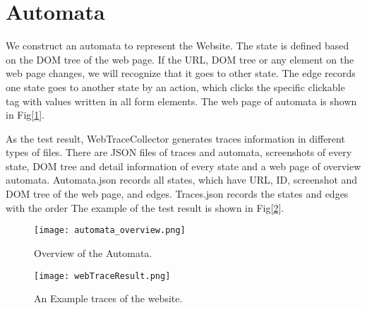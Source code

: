 
\clearpage

\section{Automata}

We construct an automata to represent the Website.
The state is defined based on the DOM tree of the web page.
If the URL, DOM tree or any element on the web page changes, we will recognize that it goes to other state.
The edge records one state goes to another state by an action,
which clicks the specific clickable tag with values written in all form elements.
The web page of automata is shown in Fig[\ref{AutomataOverview}].

As the test result, WebTraceCollector generates traces information in different types of files. 
There are JSON files of traces and automata, screenshots of every state, DOM tree and detail information of every state and a web page of overview automata.
Automata.json records all states, which have URL, ID, screenshot and DOM tree of the web page, and edges.
Traces.json records the states and edges with the order
The example of the test result is shown in Fig[\ref{TestResult}].

\clearpage

\begin{figure}[h]
	\graphicspath{{pic/}}
	\begin{center}
		\texttt{[image: automata\_overview.png]}
	\end{center}
	\caption{ Overview of the Automata. }
	\label{AutomataOverview}
\end{figure}

\begin{figure}[h]
	\graphicspath{{pic/}}
	\begin{center}
		\texttt{[image: webTraceResult.png]}
	\end{center}
	\caption{An Example traces of the website. }
	\label{TestResult}
\end{figure}


